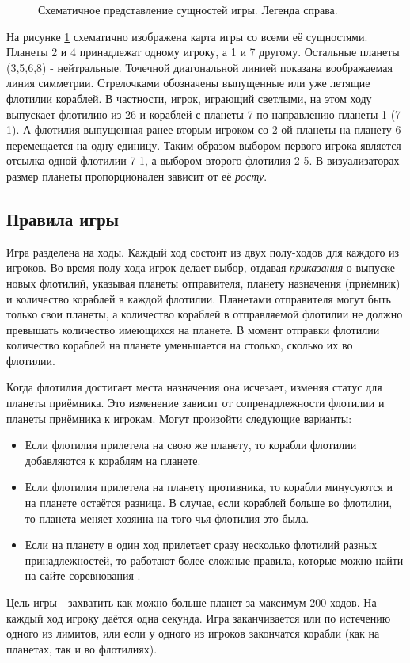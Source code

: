\documentclass[12pt]{report}
\newenvironment{myItemize}{
	\begin{itemize}
  		\setlength{\itemsep}{1pt}
  		\setlength{\parskip}{0pt}
  		\setlength{\parsep}{0pt}
}{\end{itemize}}
\begin{document}
\begin{figure}[h]
	\centering
	
	\caption{Схематичное представление сущностей игры. Легенда справа.}
	\label{fig:pw_entities}
\end{figure}
На рисунке \ref{fig:pw_entities} схематично изображена карта игры со всеми её сущностями. Планеты 2 и 4 принадлежат одному игроку, а 1 и 7 другому. Остальные планеты (3,5,6,8) - нейтральные. Точечной диагональной линией показана воображаемая линия симметрии. Стрелочками обозначены выпущенные или уже летящие флотилии кораблей. В частности, игрок, играющий светлыми, на этом ходу выпускает флотилию из 26-и кораблей с планеты 7 по направлению планеты 1 (7-1). А флотилия выпущенная ранее вторым игроком со 2-ой планеты на планету 6 перемещается на одну единицу. Таким образом выбором первого игрока является отсылка одной флотилии 7-1, а выбором второго флотилия 2-5. В визуализаторах размер планеты пропорционален зависит от её \emph{росту}.



\subsection{Правила игры}
\label{sec:game_rules}
Игра разделена на ходы. Каждый ход состоит из двух полу-ходов для каждого из игроков. Во время полу-хода игрок делает выбор, отдавая \emph{приказания} о выпуске новых флотилий, указывая планеты отправителя, планету назначения (приёмник) и количество кораблей в каждой флотилии. Планетами отправителя могут быть только свои планеты, а количество кораблей в отправляемой флотилии не должно превышать количество имеющихся на планете. В момент отправки флотилии количество кораблей на планете уменьшается на столько, сколько их во флотилии.

Когда флотилия достигает места назначения она исчезает, изменяя статус для планеты приёмника. Это изменение зависит от сопренадлежности флотилии и планеты приёмника к игрокам. Могут произойти следующие варианты:
\begin{myItemize}
\item Если флотилия прилетела на свою же планету, то корабли флотилии добавляются к кораблям на планете.
\item Если флотилия прилетела на планету противника, то корабли минусуются и на планете остаётся разница. В случае, если кораблей больше во флотилии, то планета меняет хозяина на того чья флотилия это была.
\item Если на планету в один ход прилетает сразу несколько флотилий разных принадлежностей, то работают более сложные правила, которые можно найти на сайте соревнования \citep{PlanetWarsSpec}.
\end{myItemize}
Цель игры - захватить как можно больше планет за максимум 200 ходов. На каждый ход игроку даётся одна секунда. Игра заканчивается или по истечению одного из лимитов, или если у одного из игроков закончатся корабли (как на планетах, так и во флотилиях). \citep{PlanetWarsSpec}
\end{document}

